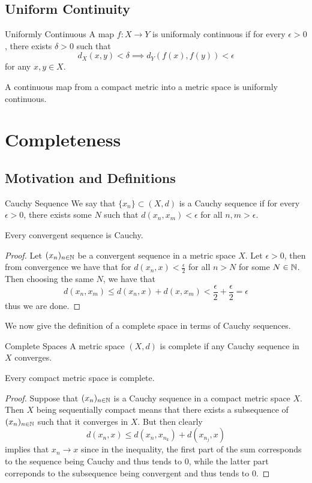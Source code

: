 \documentclass[a4paper]{article}
\begin{document}
\subsection{Uniform Continuity}
\begin{defn}{Uniformly Continuous}{} A map $f:X\to Y$ is uniformaly continuous if for every $\epsilon>0$, there exists $\delta>0$ such that $$d_X(x,y)<\delta\implies d_Y(f(x),f(y))<\epsilon$$ for any $x,y\in X$. 
\end{defn}

\begin{thm}{}{} A continuous map from a compact metric into a metric space is uniformly continuous. 
\end{thm}

\pagebreak
\section{Completeness}
\subsection{Motivation and Definitions}
\begin{defn}{Cauchy Sequence}{} We say that $\{x_n\}\subset(X,d)$ is a Cauchy sequence if for every $\epsilon>0$, there exists some $N$ such that $d(x_n,x_m)<\epsilon$ for all $n,m>\epsilon$. 
\end{defn}

\begin{prp}{}{} Every convergent sequence is Cauchy. 
\begin{proof}
Let $(x_n)_{n\in\mathbb{N}}$ be a convergent sequence in a metric space $X$. Let $\epsilon>0$, then from convergence we have that for $d(x_n,x)<\frac{\epsilon}{2}$ for all $n>N$ for some $N\in\mathbb{N}$. Then choosing the same $N$, we have that $$d(x_n,x_m)\leq d(x_n,x)+d(x,x_m)<\frac{\epsilon}{2}+\frac{\epsilon}{2}=\epsilon$$ thus we are done. 
\end{proof}
\end{prp}

We now give the definition of a complete space in terms of Cauchy sequences. 

\begin{defn}{Complete Spaces}{} A metric space $(X,d)$ is complete if any Cauchy sequence in $X$ converges. 
\end{defn}

\begin{prp}{}{} Every compact metric space is complete. 
\begin{proof}
Suppose that $(x_n)_{n\in\mathbb{N}}$ is a Cauchy sequence in a compact metric space $X$. Then $X$ being sequentially compact means that there exists a subsequence of $(x_n)_{n\in\mathbb{N}}$ such that it converges in $X$. But then clearly $$d(x_n,x)\leq d(x_n,x_{n_k})+d(x_{n_j},x)$$ implies that $x_n\to x$ since in the inequality, the first part of the sum corresponds to the sequence being Cauchy and thus tends to $0$, while the latter part correponds to the subsequence being convergent and thus tends to $0$. 
\end{proof}
\end{prp}
\end{document}
